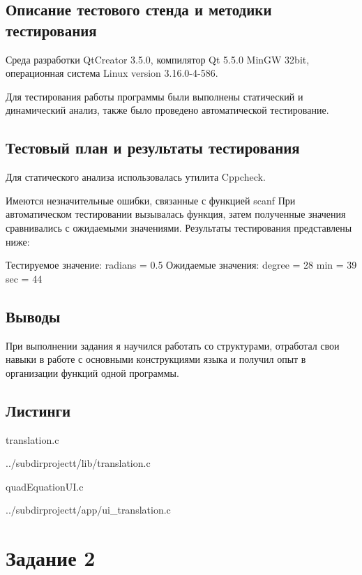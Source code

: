 \documentclass[12pt,a4paper]{report}
\begin{document}
\subsection{Описание тестового стенда и методики тестирования}
Среда разработки QtCreator 3.5.0, компилятор Qt 5.5.0 MinGW 32bit, операционная система Linux version 3.16.0-4-586.

Для тестирования работы программы были выполнены статический и динамический анализ, также было проведено автоматической тестирование.

\subsection{Тестовый план и результаты тестирования}
		Для статического анализа использовалась утилита Cppcheck.
		
		\vspace{\baselineskip}
		Имеются незначительные ошибки, связанные с функцией scanf
		\vspace{\baselineskip}
		При автоматическом тестировании вызывалась функция, затем полученные значения сравнивались с ожидаемыми значениями. Результаты тестирования представлены ниже:  
		
		\vspace{\baselineskip}
	 
Тестируемое значение: 
	radians = 0.5
Ожидаемые значения: 
	degree = 28
	min = 39
	sec = 44
 
\subsection{Выводы}

При выполнении задания я научился работать со структурами, отработал свои навыки в работе с основными конструкциями языка и получил опыт в организации функций одной программы.

\subsection*{Листинги}

translation.c

{../subdirprojectt/lib/translation.c}

\vspace{\baselineskip}

quadEquationUI.c

{../subdirprojectt/app/ui_translation.c}


\section{Задание 2}
\end{document}

